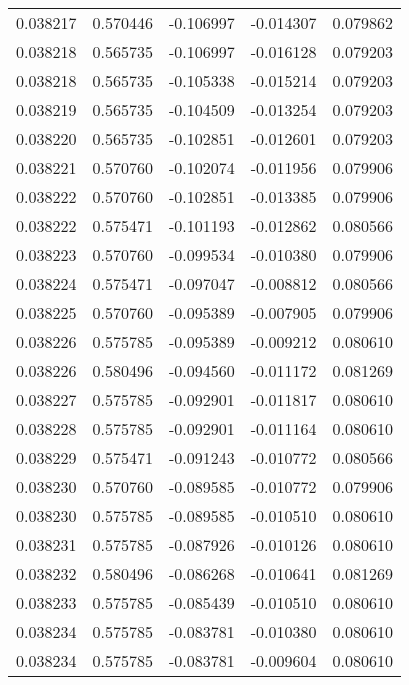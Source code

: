 \begin{tabular}{lrrrr}
0.038217    &  0.570446 & -0.106997 & -0.014307 &             0.079862 \\
0.038218    &  0.565735 & -0.106997 & -0.016128 &             0.079203 \\
0.038218    &  0.565735 & -0.105338 & -0.015214 &             0.079203 \\
0.038219    &  0.565735 & -0.104509 & -0.013254 &             0.079203 \\
0.038220    &  0.565735 & -0.102851 & -0.012601 &             0.079203 \\
0.038221    &  0.570760 & -0.102074 & -0.011956 &             0.079906 \\
0.038222    &  0.570760 & -0.102851 & -0.013385 &             0.079906 \\
0.038222    &  0.575471 & -0.101193 & -0.012862 &             0.080566 \\
0.038223    &  0.570760 & -0.099534 & -0.010380 &             0.079906 \\
0.038224    &  0.575471 & -0.097047 & -0.008812 &             0.080566 \\
0.038225    &  0.570760 & -0.095389 & -0.007905 &             0.079906 \\
0.038226    &  0.575785 & -0.095389 & -0.009212 &             0.080610 \\
0.038226    &  0.580496 & -0.094560 & -0.011172 &             0.081269 \\
0.038227    &  0.575785 & -0.092901 & -0.011817 &             0.080610 \\
0.038228    &  0.575785 & -0.092901 & -0.011164 &             0.080610 \\
0.038229    &  0.575471 & -0.091243 & -0.010772 &             0.080566 \\
0.038230    &  0.570760 & -0.089585 & -0.010772 &             0.079906 \\
0.038230    &  0.575785 & -0.089585 & -0.010510 &             0.080610 \\
0.038231    &  0.575785 & -0.087926 & -0.010126 &             0.080610 \\
0.038232    &  0.580496 & -0.086268 & -0.010641 &             0.081269 \\
0.038233    &  0.575785 & -0.085439 & -0.010510 &             0.080610 \\
0.038234    &  0.575785 & -0.083781 & -0.010380 &             0.080610 \\
0.038234    &  0.575785 & -0.083781 & -0.009604 &             0.080610 \\

\end{tabular}
